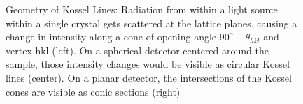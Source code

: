 \begin{figure}
\begin{subfigure}[b]{0.35\textwidth}
	\end{subfigure}
	\caption[Geometry of Kossel Lines]{Geometry of Kossel Lines: Radiation from within a light source within a single crystal gets scattered at the lattice planes, causing a change in intensity along a cone of opening angle $90^o-\theta_{hkl}$ and vertex hkl (left). On a spherical detector centered around the sample, those intensity changes would be visible as circular Kossel lines (center). On a planar detector, the intersections of the Kossel cones are visible as conic sections (right)}
	\label{fig:doubleslit}
\end{figure}